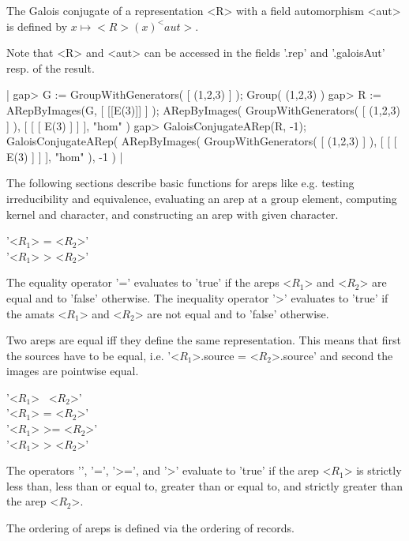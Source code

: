 The Galois conjugate of a representation <R> with a field 
automorphism <aut> is defined by $x\mapsto <R>(x)^<aut>$.

Note that <R> and <aut> can be accessed 
in the fields '.rep' and '.galoisAut' resp. of the result.

|    gap> G := GroupWithGenerators( [ (1,2,3) ] );
    Group( (1,2,3) )
    gap> R := ARepByImages(G, [ [[E(3)]] ] );
    ARepByImages(
      GroupWithGenerators( [ (1,2,3) ] ),
      [ [ [ E(3) ] ]
      ],
      "hom"
    )
    gap> GaloisConjugateARep(R, -1);
    GaloisConjugateARep(
      ARepByImages(
        GroupWithGenerators( [ (1,2,3) ] ),
        [ [ [ E(3) ] ]
        ],
        "hom"
      ),
      -1
    ) |


The following sections describe basic functions for areps like e.g.
testing irreducibility and equivalence, evaluating an arep at a
group element, computing kernel and character, and constructing an arep
with given character.
%

'<$R_1$> = <$R_2$>' \\
'<$R_1$> \<> <$R_2$>'

The equality operator '=' evaluates to 'true'  if the areps <$R_1$>
and <$R_2$> are equal and  to 'false' otherwise. The  inequality operator
'\<>' evaluates to 'true' if the amats <$R_1$> and <$R_2$> are not equal
and to 'false' otherwise.

Two areps are equal iff they define the same representation. 
This means that first the sources have to be equal, i.e. 
'<$R_1$>.source = <$R_2$>.source' and second the images are 
pointwise equal.

\bigskip
'<$R_1$> \<\ <$R_2$>' \\
'<$R_1$> \<= <$R_2$>' \\
'<$R_1$> >= <$R_2$>' \\
'<$R_1$> > <$R_2$>'

The operators '\<', '\<=', '>=', and '>' evaluate to 'true' if the 
arep <$R_1$> is strictly less than, less than or equal to, greater than or
equal to, and strictly greater than the arep <$R_2$>. 

The ordering of areps is defined via the ordering of records.


